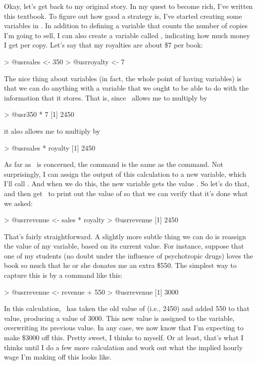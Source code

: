 Okay, let's get back to my original story. In my quest to become rich, I've written this textbook. To figure out how good a strategy is, I've started creating some variables in \R. In addition to defining a  variable that counts the number of copies I'm going to sell, I can also create a variable called , indicating how much money I get per copy. Let's say that my royalties are about \$7 per book:
\begin{rblock1}
> @usr{sales <- 350}
> @usr{royalty <- 7}
\end{rblock1}
The nice thing about variables (in fact, the whole point of having variables) is that we can do anything with a variable that we ought to be able to do with the information that it stores. That is, since \R\ allows me to multiply  by 
\begin{rblock1}
> @usr{350 * 7}
[1] 2450
\end{rblock1}
it also allows me to multiply  by 
\begin{rblock1}
> @usr{sales * royalty}
[1] 2450
\end{rblock1}
As far as \R\ is concerned, the  command is the same as the  command. Not surprisingly, I can assign the output of this calculation to a new variable, which I'll call . And when we do this, the new variable  gets the value . So let's do that, and then get \R\ to print out the value of  so that we can verify that it's done what we asked:
\begin{rblock1}
> @usr{revenue <- sales * royalty}
> @usr{revenue}
[1] 2450
\end{rblock1}
That's fairly straightforward. A slightly more subtle thing we can do is reassign the value of my variable, based on its current value. For instance, suppose that one of my students (no doubt under the influence of psychotropic drugs) loves the book so much that he or she donates me an extra \$550. The simplest way to capture this is by a command like this:
\begin{rblock1}
> @usr{revenue <- revenue + 550}
> @usr{revenue}
[1] 3000
\end{rblock1}
In this calculation, \R\ has taken the old value of  (i.e., 2450) and added 550 to that value, producing a value of 3000. This new value is assigned to the  variable, overwriting its previous value. In any case, we now know that I'm expecting to make \$3000 off this. Pretty sweet, I thinks to myself. Or at least, that's what I thinks until I do a few more calculation and work out what the implied hourly wage I'm making off this looks like. 

